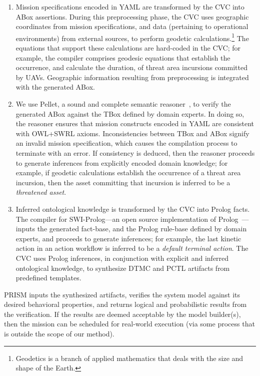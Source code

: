 \begin{enumerate}

\item Mission specifications encoded in YAML are transformed by the CVC into ABox assertions. During this preprocessing phase, the CVC uses geographic coordinates from mission specifications, and data (pertaining to operational environments) from external sources, to perform geodetic calculations.\footnote{Geodetics is a branch of applied mathematics that deals with the size and shape of the Earth.} The equations that support these calculations are hard-coded in the CVC; for example, the compiler comprises geodesic equations that establish the occurrence, and calculate the duration, of threat area incursions committed by UAVs. Geographic information resulting from preprocessing is integrated with the generated ABox.

\item We use Pellet, a sound and complete semantic reasoner~\cite{Sirin_2007}, to verify the generated ABox against the TBox defined by domain experts. In doing so, the reasoner ensures that mission constructs encoded in YAML are consistent with OWL+SWRL axioms. Inconsistencies between TBox and ABox signify an invalid mission specification, which causes the compilation process to terminate with an error. If consistency is deduced, then the reasoner proceeds to generate inferences from explicitly encoded domain knowledge; for example, if geodetic calculations establish the occurrence of a threat area incursion, then the asset committing that incursion is inferred to be a \emph{threatened asset}.

\item Inferred ontological knowledge is transformed by the CVC into Prolog facts. The compiler for SWI-Prolog---an open source implementation of Prolog~\cite{SWI_Prolog}---inputs the generated fact-base, and the Prolog rule-base defined by domain experts, and proceeds to generate inferences; for example, the last kinetic action in an action workflow is inferred to be a \emph{default terminal action}. The CVC uses Prolog inferences, in conjunction with explicit and inferred ontological knowledge, to synthesize DTMC and PCTL artifacts from predefined templates.

\end{enumerate}

PRISM inputs the synthesized artifacts, verifies the system model against its desired behavioral properties, and returns logical and probabilistic results from the verification. If the results are deemed acceptable by the model builder(s), then the mission can be scheduled for real-world execution (via some process that is outside the scope of our method).
